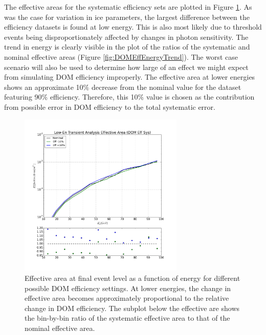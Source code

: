 \documentclass{gatech-thesis}
\begin{document}
The effective areas for the systematic efficiency sets are plotted in Figure \ref{fig:DOMSysEffArea}. As was the case for variation in ice parameters, the largest difference between the efficiency datasets is found at low energy. This is also most likely due to threshold events being disproportionately affected by changes in photon sensitivity. The trend in energy is clearly visible in the plot of the ratios of the systematic and nominal effective areas (Figure \ref{fig:DOMEffEnergyTrend}). The worst case scenario will also be used to determine how large of an effect we might expect from simulating DOM efficiency improperly. The effective area at lower energies shows an approximate 10$\%$ decrease from the nominal value for the dataset featuring 90$\%$ efficiency. Therefore, this 10$\%$ value is chosen as the contribution from possible error in DOM efficiency to the total systematic error.

\begin{figure}[ht]
  \begin{center}
    \includegraphics[width=0.7\textwidth,keepaspectratio]{LowEnTransient_EffArea_SysGENIE_DomEfficiency.png}
  \end{center}
  \caption[DOM Efficiency Systematic Effective Area Comparison]{Effective area at final event level as a function of energy for different possible DOM efficiency settings. At lower energies, the change in effective area becomes approximately proportional to the relative change in DOM efficiency. The subplot below the effective are shows the bin-by-bin ratio of the systematic effective area to that of the nominal effective area.}
  \label{fig:DOMSysEffArea}
\end{figure}
\end{document}
